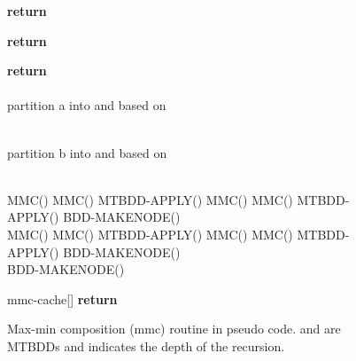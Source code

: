 \documentclass[4pt]{article}
\begin{document}
\begin{figure}
\begin{algorithmic}[1]

\State \textbf{return} 
\EndIf

\State  \textbf{return} 
\EndIf

\State  \textbf{return} 
\EndIf
\\
\State  
\\
\State  partition a into  and  based on 
  
\\
\State  partition b into  and  based on 
  
\\
\State   MMC()
\State  MMC()
\State   MTBDD-APPLY()
\State   MMC()
\State   MMC()
\State   MTBDD-APPLY()
\State   BDD-MAKENODE()
\\
\State   MMC()
\State   MMC()
\State   MTBDD-APPLY()
\State   MMC()
\State   MMC()
\State   MTBDD-APPLY()
\State   BDD-MAKENODE()
\\
\State   BDD-MAKENODE()
  
\State  mmc-cache[] 
\State  \textbf{return} 

\EndProcedure
\end{algorithmic}
\begin{comment}
\begin{verbatim}
mmc(a, b, call_level) {
  if both a and b are terminals return min(a, b);
  
  if ((r=mmc_cache(a, b, call_level))!=NULL))
    return r;
  if ((r=mmc_cache(b, a, call_level))!=NULL))
    return r;
  root_level = call_level * 2;
  
  partition a into sa[0], sa[1], sa[2] and sa[3] based on 
  root_level;

  partition b into sb[0], sb[1], sb[2] and sb[3] based on 
  root_level;

  t1 = mmc(sa[0], sb[0], call_level+1);
  t2 = mmc(sa[1], sb[2], call_level+1);
  l = mtbdd_apply(t1, t2, mtbddop_fuzzymax);
  t1 = mmc(sa[0], sb[1], call_level+1);
  t2 = mmc(sa[1], sb[3], call_level+1);
  h = mtbdd_apply(t1, t2, mtbddop_fuzzymax);
  L = bdd_makenode(root_level+1, l, h);

  t1 = mmc(sa[2], sb[0], call_level+1);
  t2 = mmc(sa[3], sb[2], call_level+1);
  l = mtbdd_apply(t1, t2, mtbddop_fuzzymax);
  t1 = mmc(sa[2], sb[1], call_level+1);
  t2 = mmc(sa[3], sb[3], call_level+1);
  h = mtbdd_apply(t1, t2, mtbddop_fuzzymax);
  H = bdd_makenode(root_level+1, l, h);

  r = bdd_makenode(root_level, L, H);
  
  mmc_cache(a, b, call_level) = r;
  return r;
}
\end{verbatim}
\end{comment}
\caption{Max-min composition (mmc) routine in pseudo code.  and  are MTBDDs and  indicates the depth of the recursion.}
\label{mmc}
\end{figure}
\end{document}
